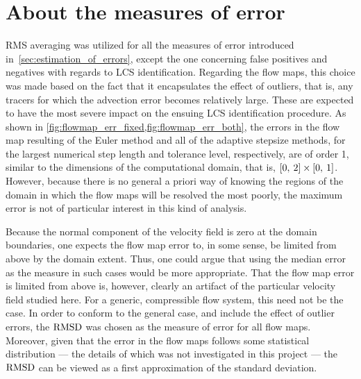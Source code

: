 \section{About the measures of error}
\label{sec:about_the_measures_of_error}

RMS averaging was utilized for all the measures of error introduced in~\cref{sec:estimation_of_errors},
except the one concerning false positives and negatives with regards to
LCS identification. Regarding the flow maps, this choice was made based on the
fact that it encapsulates the effect of outliers, that is, any tracers for which
the advection error becomes relatively large. These are expected to have the
most severe impact on the ensuing LCS identification procedure. As shown in
\cref{fig:flowmap_err_fixed,fig:flowmap_err_both}, the errors in the flow map
resulting of the Euler method and all of the adaptive stepsize methods, for the
largest numerical step length and tolerance level, respectively, are of order 1,
similar to the dimensions of the computational domain, that is,
$[0,\hspace{0.5ex}2]\times[0,\hspace{0.5ex}1]$. However, because there is no general
a priori way of knowing the regions of the domain in which the flow maps will be
resolved the most poorly, the maximum error is not of particular interest
in this kind of analysis.

Because the normal component of the velocity field is zero at the domain
boundaries, one expects the flow map error to, in some sense, be limited from
above by the domain extent. Thus, one could argue that using the median error
as the measure in such cases would be more appropriate. That the flow map
error is limited from above is, however, clearly an artifact of the particular
velocity field studied here. For a generic, compressible flow system, this need
not be the case. In order to conform to the general case, and include the effect
of outlier errors, the $\operatorname{RMSD}$ was chosen as the measure of error for all flow
maps. Moreover, given that the error in the flow maps follows some statistical
distribution --- the details of which was not investigated in this project ---
the $\operatorname{RMSD}$ can be viewed as a first approximation of the standard deviation.


